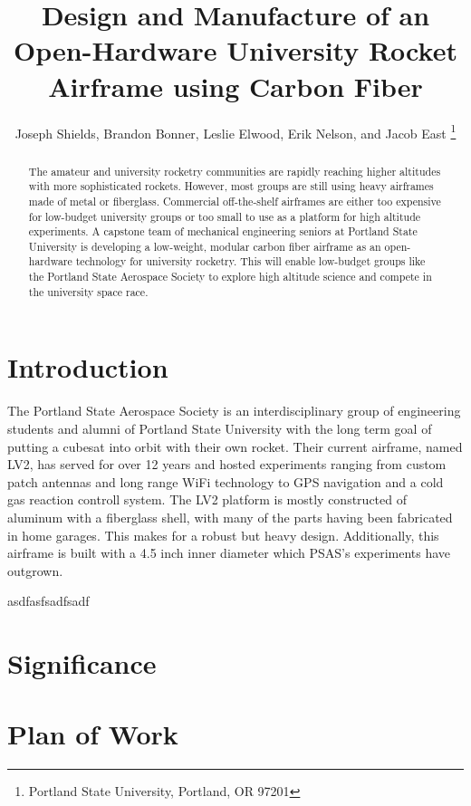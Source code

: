 \documentclass{aiaa-tc}%
\title{Design and Manufacture of an Open-Hardware 
 	University Rocket Airframe using Carbon Fiber}
\author{
Joseph Shields, Brandon Bonner, Leslie Elwood, Erik Nelson, and Jacob East
	\thanks{Portland State University, Portland, OR 97201}
 }
\begin{document}
\maketitle

\begin{abstract}
The amateur and university rocketry communities are rapidly reaching higher altitudes with more sophisticated rockets. However, most groups are still using heavy airframes made of metal or fiberglass. Commercial off-the-shelf airframes are either too expensive for low-budget university groups or too small to use as a platform for high altitude experiments. A capstone team of mechanical engineering seniors at Portland State University is developing a low-weight, modular carbon fiber airframe as an open-hardware technology for university rocketry. This will enable low-budget groups like the Portland State Aerospace Society to explore high altitude science and compete in the university space race. 
\end{abstract}

\section{Introduction}
The Portland State Aerospace Society is an interdisciplinary group of engineering students and alumni of Portland State University with the long term goal of putting a cubesat into orbit with their own rocket. 
Their current airframe, named LV2, has served for over 12 years and hosted experiments ranging from custom patch antennas and long range WiFi technology to GPS navigation and a cold gas reaction controll system. The LV2 platform is mostly constructed of aluminum with a fiberglass shell, with many of the parts having been fabricated in home garages. This makes for a robust but heavy design. Additionally, this airframe is built with a 4.5 inch inner diameter which PSAS's experiments have outgrown. 

asdfasfsadfsadf  

\section{Significance}


\section{Plan of Work}
\end{document}
